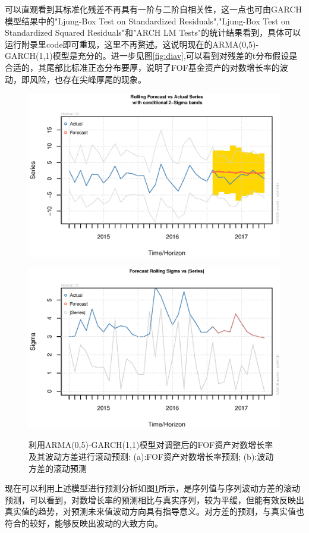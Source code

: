 可以直观看到其标准化残差不再具有一阶与二阶自相关性，这一点也可由GARCH模型结果中的"Ljung-Box Test on Standardized Residuals","Ljung-Box Test on Standardized Squared Residuals"和"ARCH LM Tests"的统计结果看到，具体可以运行附录里code即可重现，这里不再赘述。这说明现在的ARMA(0,5)-GARCH(1,1)模型是充分的。进一步见图\ref{fig:diav},可以看到对残差的t分布假设是合适的，其尾部比标准正态分布要厚，说明了FOF基金资产的对数增长率的波动，即风险，也存在尖峰厚尾的现象。
\begin{figure}[h!]
	\begin{minipage}[ht]{0.48\textwidth}
		\centering
		\includegraphics[width=\textwidth]{pic/ast/fastroll}
		\subcaption{}\label{fastroll}
	\end{minipage}%
	\hspace{0.04\textwidth}
	\begin{minipage}[ht]{0.48\textwidth}
		\centering
		\includegraphics[width=\textwidth]{pic/ast/fastrollv}
		\subcaption{}\label{fastrollv}
	\end{minipage}
	\caption{利用ARMA(0,5)-GARCH(1,1)模型对调整后的FOF资产对数增长率及其波动方差进行滚动预测: (a):FOF资产对数增长率预测; (b):波动方差的滚动预测} \label{f}
\end{figure}
\par 现在可以利用上述模型进行预测分析如图\ref{f}所示，是序列值与序列波动方差的滚动预测，可以看到，对数增长率的预测相比与真实序列，较为平缓，但能有效反映出真实值的趋势，对预测未来值波动方向具有指导意义。对方差的预测，与真实值也符合的较好，能够反映出波动的大致方向。